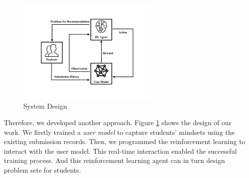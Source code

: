     \begin{figure}[!htp]
        \centering
        \includegraphics[width=0.62\textwidth]{img/system-design.pdf}
        \caption{System Design}
        \label{fig:system-design}
    \end{figure}

    Therefore, we developed another approach.
    Figure \ref{fig:system-design} shows the design of our work.
    We firstly trained a \emph{user model} to capture students' mindsets using the existing submission records.
    Then, we programmed the reinforcement learning to interact with the user model.
    This real-time interaction enabled the successful training process.
    And this reinforcement learning agent can in turn design problem sets for students.



















